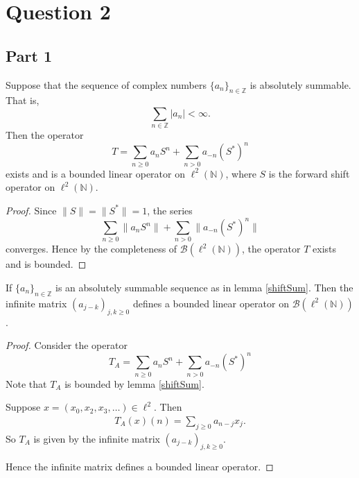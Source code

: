 \documentclass{unswmaths}
\begin{document}
\section*{Question 2}
\subsection*{Part 1}
\begin{lemma}
\label{shiftSum}
    Suppose that the sequence of complex numbers $\{a_n\}_{n\in\mathbb{Z}}$ is absolutely summable. That is,
    \begin{equation*}
        \sum_{n\in \mathbb{Z}} |a_n| < \infty.
    \end{equation*}
    Then the operator
    \begin{equation*}
        T = \sum_{n\geq0} a_n S^n + \sum_{n> 0} a_{-n} (S^*)^n
    \end{equation*}
    exists and is a bounded linear operator
    on $\ell^2(\mathbb{N})$, where $S$ is the forward shift operator on $\ell^2(\mathbb{N})$.
\end{lemma}
\begin{proof}
    Since $\|S\| = \| S^*\| = 1$, the series
    \begin{equation*}
        \sum_{n\geq0} \|a_n S^n\| + \sum_{n> 0} \|a_{-n} (S^*)^n\|
    \end{equation*}
    converges. Hence by the completeness of $\mathcal{B}(\ell^2(\mathbb{N}))$, the operator
    $T$ exists and is bounded.
\end{proof}
\begin{proposition}
    If $\{a_n\}_{n\in \mathbb{Z}}$ is an absolutely summable sequence as in lemma
    \ref{shiftSum}. Then the infinite matrix $(a_{j-k})_{j,k\geq 0}$ defines
    a bounded linear operator on $\mathcal{B}(\ell^2(\mathbb{N}))$.
\end{proposition}
\begin{proof}
    Consider the operator 
    \begin{equation*}
        T_A = \sum_{n\geq0} a_n S^n + \sum_{n> 0} a_{-n} (S^*)^n
    \end{equation*}
    Note that $T_A$ is bounded by lemma \ref{shiftSum}.
    
    Suppose $x = (x_0,x_2,x_3,\ldots) \in \ell^2$. Then
    \begin{align*}
        T_A(x)(n) = \sum_{j \geq 0} a_{n-j}x_j.
    \end{align*}
    So $T_A$ is given by the infinite matrix $(a_{j-k})_{j,k\geq 0}$. 
    
    Hence the infinite matrix defines a bounded linear operator.    
\end{proof}
\end{document}
